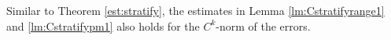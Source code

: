 \begin{remark}
Similar to Theorem \ref{est:stratify}, the estimates in Lemma \ref{lm:Cstratifyrange1} and \ref{lm:Cstratifypm1} also holds for the $C^k$-norm of the errors.

\end{remark}


